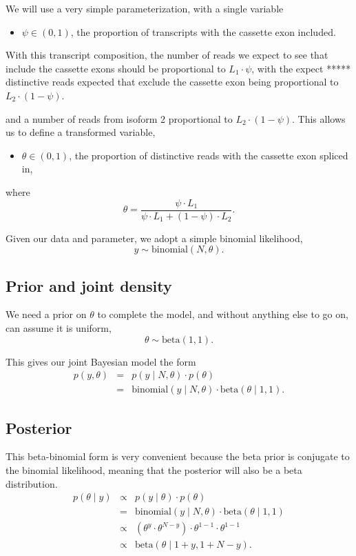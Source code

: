 \documentclass[11pt]{report}
\begin{document}
We will use a very simple parameterization, with a single variable
%
\begin{itemize}
\item $\psi \in (0, 1)$, the proportion of transcripts with the
  cassette exon included.
\end{itemize}
%
With this transcript composition, the number of reads we expect to see
that include the cassette exons should be proportional to $L_1 \cdot
\psi$, with the expect
*****
distinctive reads expected that exclude the cassette exon being
proportional to $L_2 \cdot (1 - \psi)$.

and a number of reads from
isoform 2 proportional to $L_2 \cdot (1 - \psi)$.  This allows us to
define a transformed variable,
%
\begin{itemize}
\item $\theta \in (0, 1)$, the proportion of distinctive reads with
  the cassette exon spliced in,
\end{itemize}
%
where
\[
  \theta = \frac{\psi \cdot L_1}{\psi \cdot L_1 + (1 - \psi) \cdot L_2}.
\]
\vspace*{4pt}

Given our data and parameter, we adopt a simple binomial likelihood,
%
\[
  y \sim \textrm{binomial}(N, \theta).
\]
%

\subsection{Prior and joint density}

We need a prior on $\theta$ to complete the model, and without
anything else to go on, can assume it is uniform,
%
\[
  \theta \sim \textrm{beta}(1, 1).
\]
%

This gives our joint Bayesian model the form
%
\begin{eqnarray*}
  p(y, \theta)
  & = & p(y \mid N, \theta) \cdot p(\theta)
  \\
  & = & \textrm{binomial}(y \mid N, \theta) \cdot \textrm{beta}(\theta \mid 1, 1).
\end{eqnarray*}
%

\subsection{Posterior}

This beta-binomial form is very convenient because the beta prior is
conjugate to the binomial likelihood, meaning that the posterior will
also be a beta distribution.
%
\begin{eqnarray*}
  p(\theta \mid y)
  & \propto &
              p(y \mid \theta) \cdot p(\theta)
  \\
  & = & \textrm{binomial}(y \mid N, \theta) \cdot \textrm{beta}(\theta \mid 1, 1)
  \\
  & \propto &
              \left( \theta^y \cdot \theta^{N - y} \right)
              \cdot
              \theta^{1 - 1} \cdot \theta^{1 - 1}
  \\
  & \propto & \textrm{beta}(\theta \mid 1 + y, 1 + N - y).
\end{eqnarray*}
\end{document}

